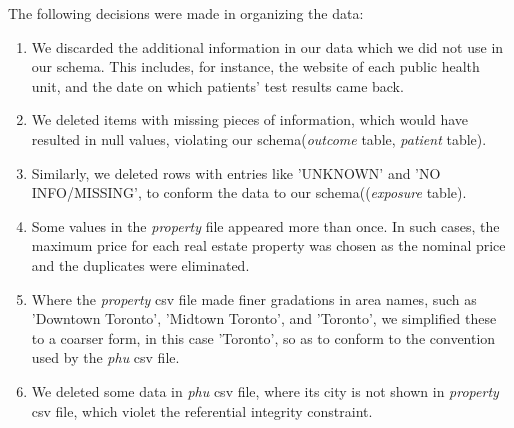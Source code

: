 \documentclass{article}
\begin{document}
The following decisions were made in organizing the data:
\begin{enumerate}
	\item We discarded the additional information in our data which we did not use in our schema. This includes, for instance,
		the website of each public health unit, and the date on which patients' test results came back.
	\item We deleted items with missing pieces of information, which would have resulted in null values, violating our schema(\emph{outcome} table, \emph{patient} table).
	\item Similarly, we deleted rows with entries like 'UNKNOWN' and 'NO INFO/MISSING', to conform the data to our schema((\emph{exposure} table).
	\item Some values in the \emph{property} file appeared more than once.
		In such cases, the maximum price for each real estate property was chosen as the nominal price and the 
		duplicates were eliminated.
	\item Where the \emph{property} csv file made finer gradations in area names, such as 'Downtown Toronto', 'Midtown Toronto', and 'Toronto', we simplified these
		to a coarser form, in this case 'Toronto', so as to conform to the convention used by the \emph{phu} csv file.
	\item We deleted some data in \emph{phu} csv file, where its city is not shown in \emph{property} csv file, which violet the referential integrity constraint. 
\end{enumerate}
\end{document}
